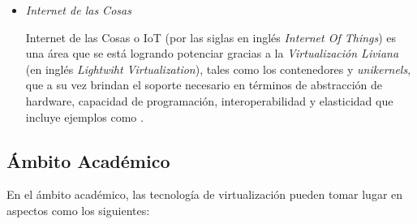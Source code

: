 \begin{itemize}
	\item \textit{Internet de las Cosas}\vspace{3mm}
	
	Internet de las Cosas o IoT (por las siglas en inglés \textit{Internet Of Things}) es una área que se está logrando potenciar gracias a la \textit{Virtualización Liviana} (en inglés \textit{Lightwiht Virtualization}), tales como los contenedores y \textit{unikernels}, que a su vez brindan el soporte necesario en términos de abstracción de hardware, capacidad de programación, interoperabilidad y elasticidad que incluye ejemplos como  \parencite{Morabito2018}.
	
	 
\end{itemize}

\subsection{Ámbito Académico}
\vspace{5mm}
En el ámbito académico, las tecnología de virtualización pueden tomar lugar en aspectos como los siguientes:\\

